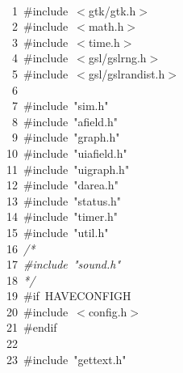 \documentclass[10pt,a4paper]{article}
\newcommand{\hlstd}[1]{\textcolor[rgb]{0,0,0}{#1}}
\newcommand{\hldstr}[1]{\textcolor[rgb]{0.51,0.51,0}{#1}}
\newcommand{\hlcom}[1]{\textcolor[rgb]{0.51,0.51,0.51}{\it{#1}}}
\newcommand{\hldir}[1]{\textcolor[rgb]{0,0.51,0}{#1}}
\newcommand{\hlline}[1]{\textcolor[rgb]{0.33,0.33,0.33}{#1}}
\begin{document}
\pagecolor{bgcolor}
\noindent
\ttfamily
\hlstd{\\
}\hlline{\ \ \ 1\ }\hlstd{}\hldir{\#include\ $<$gtk/gtk.h$>$\\
}\hlline{\ \ \ 2\ }\hldir{}\hlstd{}\hldir{\#include\ $<$math.h$>$\\
}\hlline{\ \ \ 3\ }\hldir{}\hlstd{}\hldir{\#include\ $<$time.h$>$\\
}\hlline{\ \ \ 4\ }\hldir{}\hlstd{}\hldir{\#include\ $<$gsl/gsl\textunderscore rng.h$>$\\
}\hlline{\ \ \ 5\ }\hldir{}\hlstd{}\hldir{\#include\ $<$gsl/gsl\textunderscore randist.h$>$\\
}\hlline{\ \ \ 6\ }\hldir{}\hlstd{\\
}\hlline{\ \ \ 7\ }\hlstd{}\hldir{\#include\ }\hldstr{"sim.h"}\hldir{\\
}\hlline{\ \ \ 8\ }\hldir{}\hlstd{}\hldir{\#include\ }\hldstr{"afield.h"}\hldir{\\
}\hlline{\ \ \ 9\ }\hldir{}\hlstd{}\hldir{\#include\ }\hldstr{"graph.h"}\hldir{\\
}\hlline{\ \ 10\ }\hldir{}\hlstd{}\hldir{\#include\ }\hldstr{"ui\textunderscore afield.h"}\hldir{\\
}\hlline{\ \ 11\ }\hldir{}\hlstd{}\hldir{\#include\ }\hldstr{"ui\textunderscore graph.h"}\hldir{\\
}\hlline{\ \ 12\ }\hldir{}\hlstd{}\hldir{\#include\ }\hldstr{"darea.h"}\hldir{\\
}\hlline{\ \ 13\ }\hldir{}\hlstd{}\hldir{\#include\ }\hldstr{"status.h"}\hldir{\\
}\hlline{\ \ 14\ }\hldir{}\hlstd{}\hldir{\#include\ }\hldstr{"timer.h"}\hldir{\\
}\hlline{\ \ 15\ }\hldir{}\hlstd{}\hldir{\#include\ }\hldstr{"util.h"}\hldir{\\
}\hlline{\ \ 16\ }\hldir{}\hlstd{}\hlcom{/*\\
}\hlline{\ \ 17\ }\hlcom{\#include\ "sound.h"\\
}\hlline{\ \ 18\ }\hlcom{*/}\hlstd{\\
}\hlline{\ \ 19\ }\hlstd{}\hldir{\#if\ HAVE\textunderscore CONFIG\textunderscore H\\
}\hlline{\ \ 20\ }\hldir{}\hlstd{}\hldir{\#include\ $<$config.h$>$\\
}\hlline{\ \ 21\ }\hldir{}\hlstd{}\hldir{\#endif\\
}\hlline{\ \ 22\ }\hldir{}\hlstd{\\
}\hlline{\ \ 23\ }\hlstd{}\hldir{\#include\ }\hldstr{"gettext.h"}\hldir{\\
}
\end{document}
